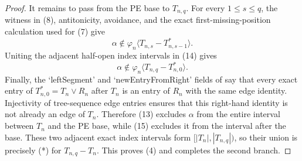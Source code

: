 \begin{proof}
It remains to pass from the PE base to $T_{n,q}$.  For every
$1\leq s\leq q$, the witness in (8), antitonicity, avoidance, and the
exact first-missing-position calculation used for (7) give
\[
 \alpha\notin
 \varphi_n\langle T_{n,s}-T_{n,s-1}^{*}\rangle.                \tag{14}
\]
Uniting the adjacent half-open index intervals in (14) gives
\[
 \alpha\notin
 \varphi_n\langle T_{n,q}-T_{n,0}^{*}\rangle.                 \tag{15}
\]
Finally, the `leftSegment' and `newEntryFromRight' fields of
 say that every exact entry of
$T_{n,0}^{*}=T_n\vee R_n$ after $T_n$ is an entry of $R_n$ with the
same edge identity.  Injectivity of tree-sequence edge entries ensures
that this right-hand identity is not already an edge of $T_n$.
Therefore (13) excludes $\alpha$ from the entire interval between
$T_n$ and the PE base, while (15) excludes it from the interval after
the base.  These two adjacent exact index intervals form
$[|T_n|,|T_{n,q}|)$, so their union is precisely (*) for
$T_{n,q}-T_n$.  This proves (4) and completes the second branch.
\end{proof}

